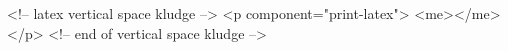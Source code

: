 <!-- latex vertical space kludge  -->
<p component="print-latex">
      	      <me>\spacer\vspace*{-.2in}\spacer</me>	  
</p>
<!-- end of vertical space kludge -->
